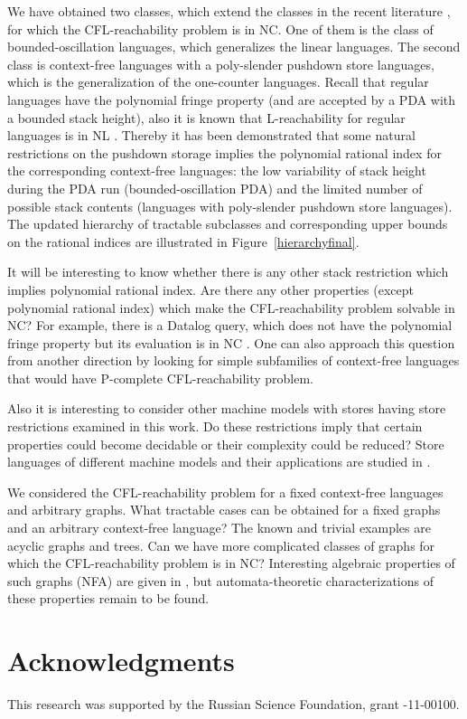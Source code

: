 \documentclass{ws-ijfcs}
\begin{document}
We have obtained two classes, which extend the classes in the recent literature \cite{ChainQ, labelledGraphs, LReach, Regularrealizability, Ullman}, for which the CFL-reachability problem is in NC. One of them is the class of bounded-oscillation languages, which generalizes the linear languages. The second class is context-free languages with a poly-slender pushdown store languages, which is the generalization of the one-counter languages. Recall that regular languages have the polynomial fringe property (and are accepted by a PDA with a bounded stack height), also it is known that L-reachability for regular languages is in NL \cite{LReach, Yannakakis}. Thereby it has been demonstrated that some natural restrictions on the pushdown storage implies the polynomial rational index for the corresponding context-free languages: the low variability of stack height during the PDA run (bounded-oscillation PDA) and the limited number of possible stack contents (languages with poly-slender pushdown store languages). The updated hierarchy of tractable subclasses and corresponding upper bounds on the rational indices are illustrated in Figure~\ref{hierarchyfinal}.


It will be interesting to know whether there is any other stack restriction which implies polynomial rational index. Are there any other properties (except polynomial rational index) which make the CFL-reachability problem solvable in NC? For example, there is a Datalog query, which does not have the polynomial fringe property but its evaluation is in NC \cite{Kanellakis}. One can also approach this question from another direction by looking for simple subfamilies of context-free languages that would have P-complete CFL-reachability problem.


Also it is interesting to consider other machine models with stores having store restrictions examined in this work. Do these restrictions imply that certain properties could become decidable or their complexity could be reduced? Store languages of different machine models and their applications are studied in \cite{ Ibarra2018OnSL, IBARRA201928}.


We considered the CFL-reachability problem for a fixed context-free languages and arbitrary graphs. What tractable cases can be obtained for a fixed graphs and an arbitrary context-free language? The known and trivial examples are acyclic graphs and trees. Can we have more complicated classes of graphs for which the CFL-reachability problem is in NC? Interesting algebraic properties of such graphs (NFA) are given in \cite{ganardi2016circuit}, but automata-theoretic characterizations of these properties remain to be found.




\section*{Acknowledgments}
This research was supported by the Russian Science Foundation, grant -11-00100.



  

\end{document}
